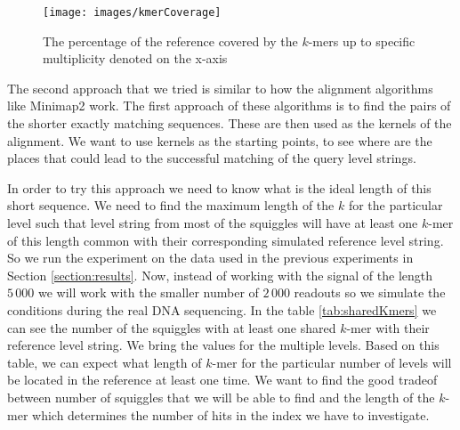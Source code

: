 \begin{figure}
\centerline{\texttt{[image: images/kmerCoverage]}}
\caption[TODO]{The percentage of the reference covered by the $k$-mers up to specific multiplicity
denoted on the x-axis}
\label{obr:kmerCoverage}
\end{figure}

The second approach that we tried is similar to how the alignment algorithms like
Minimap2 work. The first approach of these algorithms is to find the pairs of the shorter
exactly matching sequences. These are then used as the kernels of the alignment. We want
to use kernels as the starting points, to see where are the places that could lead to the
successful matching of the query level strings.

In order to try this approach we need to know what is the ideal length of this short
sequence. We need to find the maximum length of the $k$ for the particular level
such that level string from most of the squiggles will have at least one $k$-mer
of this length common with their corresponding simulated reference level string.
So we run the experiment on the data used in the previous experiments in Section
\ref{section:results}. Now, instead of working with the signal of the length
$5\,000$ we will work with the smaller number of $2\,000$ readouts so we
simulate the conditions during the real DNA sequencing. In the table \ref{tab:sharedKmers}
we can see the number of the squiggles with at least one shared $k$-mer with their reference
level string. We bring the values for the multiple levels. Based on this table,
we can expect what length of $k$-mer for the particular number of levels will be located
in the reference at least one time. We want to find the good tradeof between number of
squiggles that we will be able to find and the length of the $k$-mer which determines
the number of hits in the index we have to investigate.

